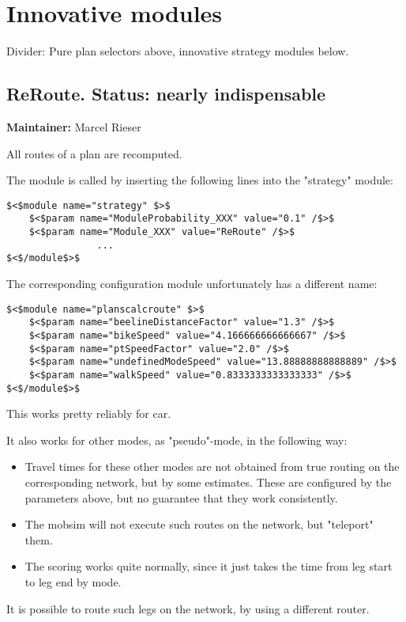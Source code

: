 \vfill\eject
\section{Innovative modules}


Divider: Pure plan selectors above, innovative strategy modules below.

\subsection{ReRoute.  Status: nearly indispensable}

\textbf{Maintainer:} Marcel Rieser

All routes of a plan are recomputed.

The module is called by inserting the following lines into the "strategy" module:
\begin{verbatim}
$<$module name="strategy" $>$
	$<$param name="ModuleProbability_XXX" value="0.1" /$>$
	$<$param name="Module_XXX" value="ReRoute" /$>$
                ...
$<$/module$>$
\end{verbatim}

The corresponding configuration module unfortunately has a different name:
\begin{verbatim}
$<$module name="planscalcroute" $>$
	$<$param name="beelineDistanceFactor" value="1.3" /$>$
	$<$param name="bikeSpeed" value="4.166666666666667" /$>$
	$<$param name="ptSpeedFactor" value="2.0" /$>$
	$<$param name="undefinedModeSpeed" value="13.88888888888889" /$>$
	$<$param name="walkSpeed" value="0.8333333333333333" /$>$
$<$/module$>$
\end{verbatim}

This works pretty reliably for car.

It also works for other modes, as "pseudo"-mode, in the following way:
\begin{itemize}
	\item Travel times for these other modes are not obtained from true  routing on the corresponding network, but by some estimates. These  are configured by the parameters above, but no guarantee that they work  consistently.
	\item The mobsim will not execute such routes on the network, but "teleport" them.
	\item The scoring works quite normally, since it just takes the time from leg start to leg end by mode.
\end{itemize}

It is possible to route such legs on the network, by using a different router.

